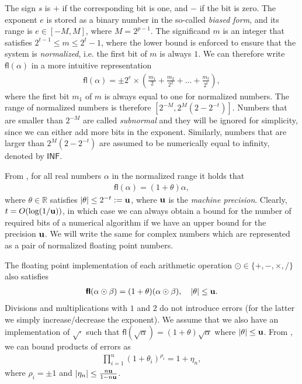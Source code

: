 \documentclass{article}
\newcommand{\lpar}{\left(}
\newcommand{\rpar}{\right)}
\newcommand{\fl}{\boldsymbol{\mathsf{fl}}}
\newcommand{\umach}{\textbf{\textup{u}}}
\newcommand{\FLINF}{\mathsf{INF}}
\begin{document}
The sign $s$ is $+$ if the corresponding bit is one, and $-$ if the bit is zero. The exponent $e$ is stored as a binary number in the so-called \textit{biased form}, and its range is $e\in[-M,M]$, where $M=2^{p-1}$. The significand $m$ is an integer that satisfies $2^{t-1}\leq m \leq 2^t-1$, where the lower bound is enforced to ensure that the system is \textit{normalized}, i.e. the first bit of $m$ is always $1$.
We can therefore write $\fl(\alpha)$ in a more intuitive representation
\begin{align*}
    \fl(\alpha) = \pm 2^{e}\times \lpar \tfrac{m_1}{2} + \tfrac{m_2}{2^2} + \ldots + \tfrac{m_t}{2^t} \rpar,
\end{align*}
where the first bit $m_1$ of $m$ is always equal to one for normalized numbers. The range of normalized numbers is therefore $[2^{-M},2^{M}(2-2^{-t})]$. Numbers that are smaller than $2^{-M}$ are called \textit{subnormal} and they will be ignored for simplicity, since we can either add more bits in the exponent. Similarly, numbers that are larger than $2^{M}(2-2^{-t})$ are assumed to be numerically equal to infinity, denoted by $\FLINF$. 

From \cite[Theorem 2.2]{higham2002accuracy},
for all real numbers $\alpha$ in the normalized range it holds that \begin{align*}
    \fl(\alpha) = (1+\theta)\alpha,
\end{align*}
where $\theta\in\mathbb{R}$ satisfies $|\theta|\leq 2^{-t}:=\umach$, where $\umach$ is the \textit{machine precision}. Clearly, $t=O(\log(1/\umach))$, in which case we can always obtain a bound for the number of required bits of a numerical algorithm if we have an upper bound for the precision $\umach$. We will write the same for complex numbers which are represented as a pair of normalized floating point numbers.

The floating point implementation of each arithmetic operation $\odot \in\{+,-,\times,/\}$ also satisfies
\begin{align}
    \fl(\alpha\odot\beta) = (1+\theta)(\alpha\odot\beta),\quad |\theta|\leq\umach.
\end{align}
Divisions and multiplications with $1$ and $2$ do not introduce errors (for the latter we simply increase/decrease the exponent).
We assume that we also have an implementation of $\sqrt{\cdot}$ such that $\fl(\sqrt{\alpha})=(1+\theta)\sqrt{\alpha}$ where $|\theta|\leq \umach$.
From \cite[Lemma 3.1]{higham2002accuracy}, we can bound products of errors as
\begin{align*}
    \prod_{i=1}^n (1+\theta_i)^{\rho_i} = 1+\eta_n,
\end{align*}
where $\rho_i=\pm 1$ and $|\eta_n|\leq \tfrac{n\umach}{1-n\umach}$.
\end{document}
